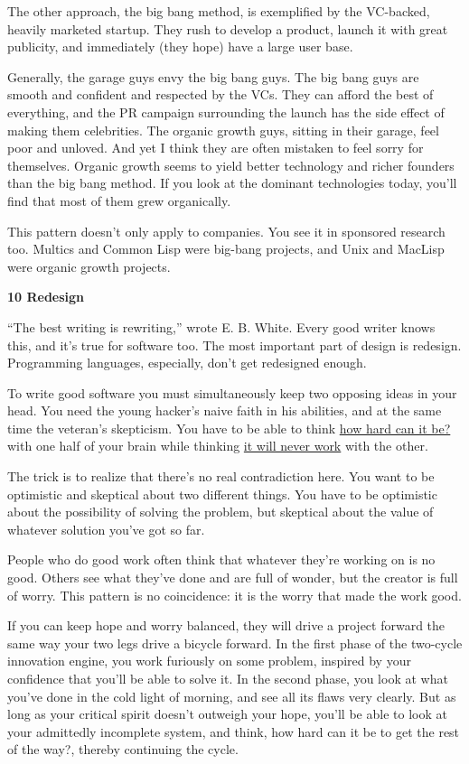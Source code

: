 The other approach, the big bang method, is exemplified by the
VC-backed, heavily marketed startup. They rush to develop a product,
launch it with great publicity, and immediately (they hope) have a large
user base.

Generally, the garage guys envy the big bang guys. The big bang guys are
smooth and confident and respected by the VCs. They can afford the best
of everything, and the PR campaign surrounding the launch has the side
effect of making them celebrities. The organic growth guys, sitting in
their garage, feel poor and unloved. And yet I think they are often
mistaken to feel sorry for themselves. Organic growth seems to yield
better technology and richer founders than the big bang method. If you
look at the dominant technologies today, you'll find that most of them
grew organically.

This pattern doesn't only apply to companies. You see it in sponsored
research too. Multics and Common Lisp were big-bang projects, and Unix
and MacLisp were organic growth projects.

\textbf{10 Redesign}

``The best writing is rewriting,'' wrote E. B. White. Every good writer
knows this, and it's true for software too. The most important part of
design is redesign. Programming languages, especially, don't get
redesigned enough.

To write good software you must simultaneously keep two opposing ideas
in your head. You need the young hacker's naive faith in his abilities,
and at the same time the veteran's skepticism. You have to be able to
think \href{http://www.trevorblackwell.com}{how hard can it be?} with
one half of your brain while thinking
\href{http://www.pdos.lcs.mit.edu/~rtm/}{it will never work} with the
other.

The trick is to realize that there's no real contradiction here. You
want to be optimistic and skeptical about two different things. You have
to be optimistic about the possibility of solving the problem, but
skeptical about the value of whatever solution you've got so far.

People who do good work often think that whatever they're working on is
no good. Others see what they've done and are full of wonder, but the
creator is full of worry. This pattern is no coincidence: it is the
worry that made the work good.

If you can keep hope and worry balanced, they will drive a project
forward the same way your two legs drive a bicycle forward. In the first
phase of the two-cycle innovation engine, you work furiously on some
problem, inspired by your confidence that you'll be able to solve it. In
the second phase, you look at what you've done in the cold light of
morning, and see all its flaws very clearly. But as long as your
critical spirit doesn't outweigh your hope, you'll be able to look at
your admittedly incomplete system, and think, how hard can it be to get
the rest of the way?, thereby continuing the cycle.

